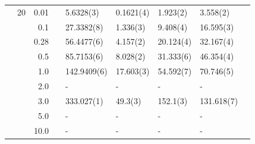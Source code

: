 \begin{table}
\begin{tabularx}{\textwidth}{R{1cm}rrcR{2.3cm}R{2.3cm}R{2.3cm}R{2.3cm}R{1cm}}
		&20 & 0.01 && 5.6328(3) & 0.1621(4) & 1.923(2) & 3.558(2) \\
		&& 0.1 && 27.3382(8) & 1.336(3) & 9.408(4) & 16.595(3) \\
		&& 0.28 && 56.4477(6) & 4.157(2) & 20.124(4) & 32.167(4) \\
		&& 0.5 && 85.7153(6) & 8.028(2) & 31.333(6) & 46.354(4) \\
		&& 1.0 && 142.9409(6) & 17.603(3) & 54.592(7) & 70.746(5) \\
		&& 2.0 && - & - & - & -\\
		&& 3.0 && 333.027(1) & 49.3(3) & 152.1(3) & 131.618(7) \\ 
		&& 5.0 && - & - & - & -\\
		&& 10.0 && - & - & - & -\\
		\hline \hline
	\end{tabularx}
\end{table}

